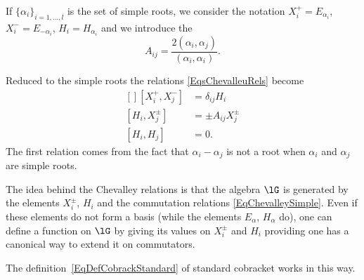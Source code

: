 \begin{definition}  \label{DefORftFjP}
	If \( \{ \alpha_i \}_{i=1,\ldots,l}\) is the set of simple roots, we consider the notation \( X_i^+=E_{\alpha_i}\), \( X^-_i=E_{-\alpha_i}\), \( H_i=H_{\alpha_i}\) and we introduce the 
	\begin{equation}
		A_{ij}=\frac{ 2(\alpha_i,\alpha_j) }{ (\alpha_i,\alpha_i) }.
	\end{equation}
\end{definition}
Reduced to the simple roots the relations \eqref{EqsChevalleuRels} become
\begin{equation}        \label{EqChevalleySimple}
	\begin{aligned}[]
		[X^+_i,X^-_j]   & =\delta_{ij}H_i      \\
		[H_i,X^{\pm}_j] & =\pm A_{ij}X^{\pm}_j \\
		[H_i,H_j]       & =0.
	\end{aligned}
\end{equation}
The first relation comes from the fact that \( \alpha_i-\alpha_j\) is not a root when \( \alpha_i\) and \( \alpha_j\) are simple roots.

\begin{remark}
	The idea behind the Chevalley relations  is that the algebra \( \lG\) is generated by the elements \( X^{\pm}_i\), \( H_i\) and the commutation relations \eqref{EqChevalleySimple}. Even if these elements do not form a basis (while the elements \( E_{\alpha}\), \( H_{\alpha}\) do), one can define a function on \( \lG\) by giving its values on \( X^{\pm}_i\) and \( H_i\) providing one has a canonical way to extend it on commutators.

	The definition~\ref{EqDefCobrackStandard} of standard cobracket works in this way.
\end{remark}

